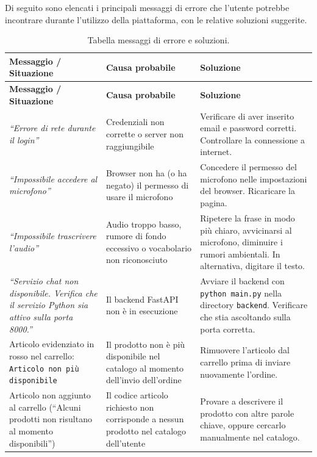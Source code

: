 Di seguito sono elencati i principali messaggi di errore che l'utente potrebbe incontrare durante l'utilizzo della piattaforma, con le relative soluzioni suggerite.

\begin{longtable}{|p{4cm}|p{4cm}|p{5.5cm}|}
    \caption{Tabella messaggi di errore e soluzioni.}
    \label{tab:errori} \\
    \hline
    \rowcolor{gray!10} \textbf{Messaggio / Situazione} & \textbf{Causa probabile} & \textbf{Soluzione} \\
    \hline
    \endfirsthead
    \hline
    \rowcolor{gray!10} \textbf{Messaggio / Situazione} & \textbf{Causa probabile} & \textbf{Soluzione} \\
    \hline
    \endhead
    \hline
    \endfoot

    \textit{``Errore di rete durante il login''} & Credenziali non corrette o server non raggiungibile & Verificare di aver inserito email e password corretti. Controllare la connessione a internet. \\
    \hline
    \textit{``Impossibile accedere al microfono''} & Browser non ha (o ha negato) il permesso di usare il microfono & Concedere il permesso del microfono nelle impostazioni del browser. Ricaricare la pagina. \\
    \hline
    \textit{``Impossibile trascrivere l'audio''} & Audio troppo basso, rumore di fondo eccessivo o vocabolario non riconosciuto & Ripetere la frase in modo pi\`u chiaro, avvicinarsi al microfono, diminuire i rumori ambientali. In alternativa, digitare il testo. \\
    \hline
    \textit{``Servizio chat non disponibile. Verifica che il servizio Python sia attivo sulla porta 8000.''} & Il backend FastAPI non \`e in esecuzione & Avviare il backend con \texttt{python main.py} nella directory \texttt{backend}. Verificare che stia ascoltando sulla porta corretta. \\
    \hline
    Articolo evidenziato in rosso nel carrello: \texttt{Articolo non pi\`u disponibile} & Il prodotto non \`e pi\`u disponibile nel catalogo al momento dell'invio dell'ordine & Rimuovere l'articolo dal carrello prima di inviare nuovamente l'ordine. \\
    \hline
    Articolo non aggiunto al carrello (``Alcuni prodotti non risultano al momento disponibili'') & Il codice articolo richiesto non corrisponde a nessun prodotto nel catalogo dell'utente & Provare a descrivere il prodotto con altre parole chiave, oppure cercarlo manualmente nel catalogo. \\

\end{longtable}
